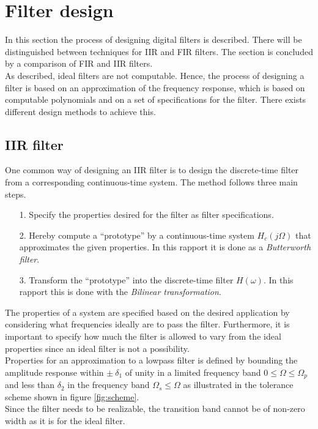 \section{Filter design}
In this section the process of designing digital filters is described. There will be distinguished between techniques for IIR and FIR filters. The section is concluded by a comparison of FIR and IIR filters. \\  
As described, ideal filters are not computable. Hence, the process of designing a filter is based on an approximation of the frequency response, which is based on computable polynomials and on a set of specifications for the filter. There exists different design methods to achieve this.

\subsection{IIR filter}
One common way of designing an IIR filter is to design the discrete-time filter from a corresponding continuous-time system. The method follows three main steps. 
\begin{itemize}
\item[1.] Specify the properties desired for the filter as filter specifications.
\item[2.] Hereby compute a ``prototype'' by a continuous-time system $H_c(j\Omega)$ that approximates the given properties. In this rapport it is done as a \textit{Butterworth filter}.  
\item[3.] Transform the ``prototype'' into the discrete-time filter $H(\omega)$. In this rapport this is done with the \textit{Bilinear transformation}. 
\end{itemize}

The properties of a system are specified based on the desired application by considering what frequencies ideally are to pass the filter. Furthermore, it is important to specify how much the filter is allowed to vary from the ideal properties since an ideal filter is not a possibility. \\
Properties for an approximation to a lowpass filter is defined by bounding the amplitude response within $\pm \ \delta_1$ of unity in a limited frequency band $0 \leq \Omega \leq \Omega_p $ and less than $\delta_2$ in the frequency band $\Omega_s \leq \Omega$ as illustrated in the tolerance scheme shown in figure \ref{fig:scheme}. \\
Since the filter needs to be realizable, the transition band cannot be of non-zero width as it is for the ideal filter.

